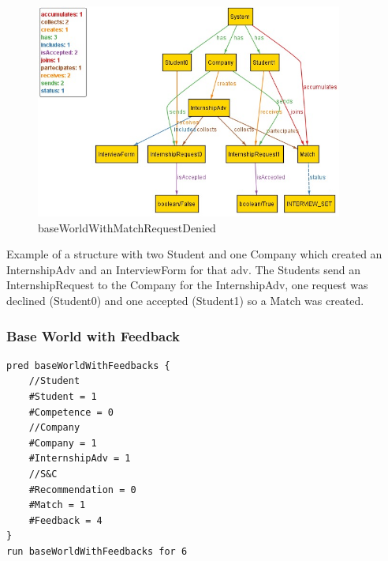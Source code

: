 \begin{figure}[h]
    \centering
    \includegraphics[width=0.9\textwidth]{Images/AlloyModel_images/baseWorldWithMatchRequestDenied.png}
    \caption{baseWorldWithMatchRequestDenied}
    \label{fig:figure2}
\end{figure}
Example of a structure with two Student and one Company which created an InternshipAdv and an InterviewForm for that adv. The Students send an InternshipRequest to the Company for the InternshipAdv, one request was declined (Student0) and one accepted (Student1) so a Match was created.

\clearpage

\subsubsection{Base World with Feedback}
\begin{lstlisting}
pred baseWorldWithFeedbacks {
	//Student
	#Student = 1
	#Competence = 0
	//Company
	#Company = 1
	#InternshipAdv = 1
	//S&C
	#Recommendation = 0
	#Match = 1
	#Feedback = 4
}
run baseWorldWithFeedbacks for 6
\end{lstlisting}

